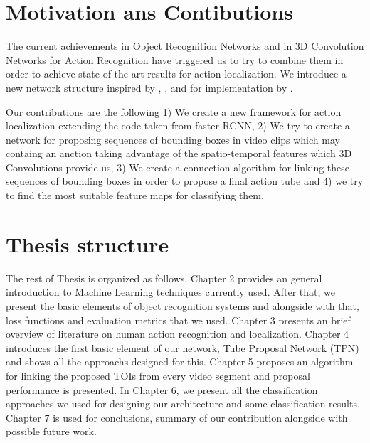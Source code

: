 \section{Motivation ans Contibutions}
The current achievements in Object Recognition Networks and in 3D Convolution Networks for Action Recognition have triggered us to try
to combine them in order to achieve state-of-the-art results for action localization. We introduce a new network structure inspired by
\cite{DBLP:journals/corr/HouCS17}, \cite{DBLP:journals/corr/abs-1712-09184},\cite{Ren:2015:FRT:2969239.2969250} and for implementation
by \cite{jjfaster2rcnn}.

Our contributions are the following 1) We create a new framework for action localization extending the code taken from faster RCNN,
2) We try to create a network for proposing sequences of bounding boxes in video clips which may containg an anction taking advantage
of the spatio-temporal features which 3D Convolutions provide us, 3) We create a connection algorithm for linking these sequences of
bounding boxes in order to propose a final action tube and 4) we try to find the most suitable feature maps for classifying them.

\section{Thesis structure}
The rest of Thesis is organized as follows. Chapter 2 provides an general introduction to Machine Learning techniques currently used.
After that, we present the basic elements of object recognition systems and alongside with that, loss functions and evaluation metrics that
we used. Chapter 3 presents an brief overview of literature on human action recognition and localization. Chapter 4 introduces the first basic
element of our network, Tube Proposal Network (TPN) and shows all the approachs designed for this. Chapter 5 proposes an algorithm
for linking the proposed TOIs from every video segment and proposal performance is presented. In Chapter 6, we present all the classification
approaches we used for designing our architecture and some classification results.  Chapter 7 is used for conclusions, summary of our contribution
alongside with possible future work.

% 
